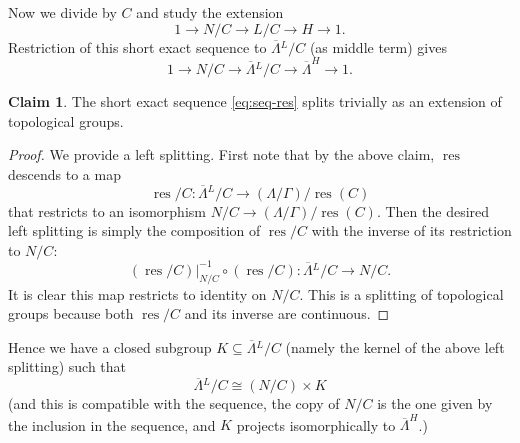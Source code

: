 \documentclass[JEP,XML,SOM,Unicode,published]{cedram}
\newcommand{\oLL}{\ensuremath{\overline{\Lambda}{}^L}}
\DeclareMathOperator{\res}{res}
\theoremstyle{definition}
\newtheorem{claim}[thm]{Claim}
\begin{document}
Now we divide by $C$ and study the extension
\[
1\to N/C \to L/C \to H\to 1.
\]
Restriction of this short exact sequence to $\oLL/C$ (as middle term) gives
\begin{equation}\label{eq:seq-res}
1\to N/C \to \oLL/C\to \overline{\Lambda}^{H}\to 1.
\end{equation}
\begin{claim}\label{claim:l-split}
The short exact sequence \eqref{eq:seq-res} splits trivially as an extension of topological groups.
\end{claim}
\begin{proof} We provide a left splitting. First note that by the above claim, $\res$ descends to a map
\[
\res/C : \oLL/C\to (\Lambda/\Gamma)/\res(C)
\]
that restricts to an isomorphism $N/C\to (\Lambda/\Gamma)/\res(C)$. Then the desired left splitting is simply the composition of $\res/C$ with the inverse of its restriction to $N/C$:
\[
(\res/C)|_{N/C}^{-1} \circ (\res/C): \oLL/C\longrightarrow N/C.
\]
It is clear this map restricts to identity on $N/C$. This is a splitting of topological groups because both $\res/C$ and its inverse are continuous.\end{proof}
Hence we have a closed subgroup $K\subseteq \oLL/C$ (namely the kernel of the above left splitting) such that
\[
\oLL/C\cong (N/C) \times K
\]
(and this is compatible with the sequence, \ie the copy of $N/C$ is the one given by the inclusion in the sequence, and $K$ projects isomorphically to $\overline{\Lambda}^{H}$.)
\end{document}
